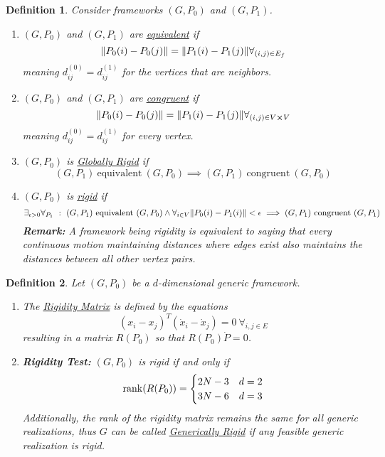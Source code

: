 \documentclass[]{article}
\numberwithin{equation}{section}
\newcommand{\st}{\ : \ }
\newtheorem{definition}{Definition}
\begin{document}
\begin{definition}\label{def:rigid_frame_def}
    Consider frameworks $(G, P_0)$ and $(G, P_1)$.
    \begin{enumerate}
        \item $(G, P_0)$ and $(G, P_1)$ are \emph{\underline{equivalent}} if \[
            \norm{P_0(i) - P_0(j)} = \norm{P_1(i) - P_1(j)} \forall_{(i,j) \in E_f}
        \] meaning $d_{ij}^{(0)} = d_{ij}^{(1)}$ for the vertices that are neighbors.
        \item $(G, P_0)$ and $(G, P_1)$ are \emph{\underline{congruent}} if \[
            \norm{P_0(i) - P_0(j)} = \norm{P_1(i) - P_1(j)} \forall_{(i,j) \in V \cross V}
        \] meaning $d_{ij}^{(0)} = d_{ij}^{(1)}$ for every vertex.
        \item $(G, P_0)$ is \emph{\underline{Globally Rigid}} if \[
            (G, P_1) \ \text{equivalent} \ (G, P_0) \implies (G, P_1) \ \text{congruent} \ (G, P_0)
        \]
        \item $(G, P_0)$ is \emph{\underline{rigid}} if \[
            \exists_{\epsilon>0} \forall_{P_1} \st
            (G, P_1) \ \text{equivalent} \ (G, P_0) 
                \land \forall_{i \in V}  \norm{P_0(i) - P_1(i)} < \epsilon 
            \implies (G, P_1) \ \text{congruent} \ (G, P_1)
        \]
        \textbf{Remark:}
        A framework being rigidity is equivalent to saying that every continuous motion maintaining distances where edges exist also maintains the distances between all other vertex pairs.
    \end{enumerate}
\end{definition}

\begin{definition} \label{def:graph_rigid_test}
    Let $(G, P_0)$ be a $d$-dimensional generic framework.
    \begin{enumerate}
        \item \label{def:rigid_matrix}
            The \emph{\underline{Rigidity Matrix}} is defined by the equations \[
                (x_i - x_j)^T (\dot{x}_i - \dot{x}_j) = 0 \ \forall_{i,j \in E}
            \] resulting in a matrix $R(P_0)$ so that $R(P_0) \dot{P} = 0$.
        \item \label{def:rigid_test}
            \textbf{Rigidity Test:} $(G, P_0)$ is rigid if and only if \[
                \rank(R(P_0)) = \begin{cases}
                    2N - 3 & d=2\\
                    3N - 6 & d=3
                \end{cases}
            \] Additionally, the rank of the rigidity matrix remains the same for all generic realizations, thus $G$ can be called \emph{\underline{Generically Rigid}} if any feasible generic realization is rigid.
    \end{enumerate}
\end{definition}
\end{document}
